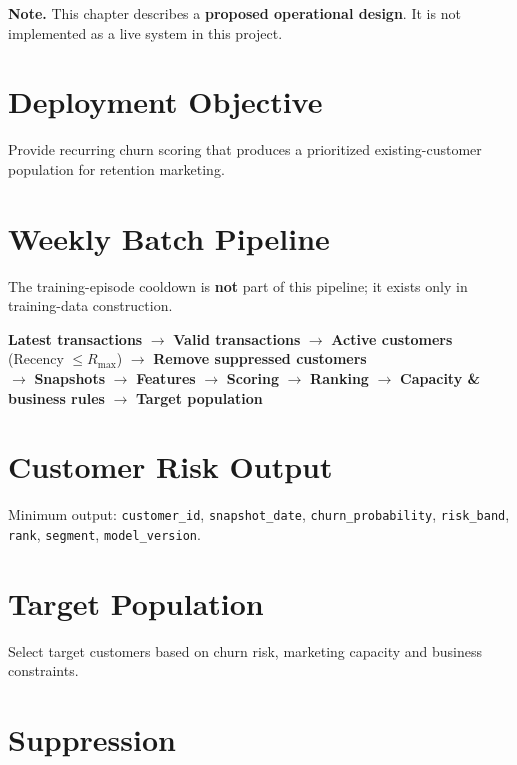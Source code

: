 \textbf{Note.} This chapter describes a \textbf{proposed operational design}. It is not implemented as a live system in this project.

\section{Deployment Objective}
\label{sec:8-1}

Provide recurring churn scoring that produces a prioritized existing-customer population for retention marketing.

\section{Weekly Batch Pipeline}
\label{sec:8-2}

The training-episode cooldown is \textbf{not} part of this pipeline; it exists only in training-data construction.

\begin{center}
\textbf{Latest transactions} $\rightarrow$ \textbf{Valid transactions} $\rightarrow$ \textbf{Active customers} (Recency $\leq R_{\max}$) $\rightarrow$ \textbf{Remove suppressed customers} \\[0.3cm]
$\rightarrow$ \textbf{Snapshots} $\rightarrow$ \textbf{Features} $\rightarrow$ \textbf{Scoring} $\rightarrow$ \textbf{Ranking} $\rightarrow$ \textbf{Capacity \& business rules} $\rightarrow$ \textbf{Target population}
\end{center}

\section{Customer Risk Output}
\label{sec:8-3}

Minimum output: \texttt{customer\_id}, \texttt{snapshot\_date}, \texttt{churn\_probability}, \texttt{risk\_band}, \texttt{rank}, \texttt{segment}, \texttt{model\_version}.

\section{Target Population}
\label{sec:8-4}

Select target customers based on churn risk, marketing capacity and business constraints.

\section{Suppression}
\label{sec:8-5}

